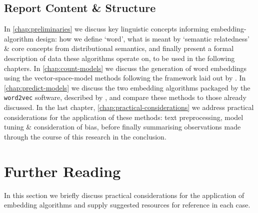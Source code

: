 \documentclass{ucetd}
\begin{document}
\section{Report Content \& Structure}
In \autoref{chap:preliminaries} we discuss key linguistic concepts informing embedding-algorithm design: how we define `word', what is meant by `semantic relatedness' \& core concepts from distributional semantics, and finally present a formal description of data these algorithms operate on, to be used in the following chapters. In \autoref{chap:count-models} we discuss the generation of word embeddings using the vector-space-model methods following the framework laid out by \textcite{turney10-from-frequen-to-meanin}. In \autoref{chap:predict-models} we discuss the two embedding algorithms packaged by the \texttt{word2vec} software, described by \textcite{mikolov13-distr-repres-words-phras-their-compos}, and compare these methods to those already discussed. In the last chapter, \autoref{chap:practical-considerations} we address practical considerations for the application of these methods: text preprocessing, model tuning \& consideration of bias, before finally summarising observations made through the course of this research in the conclusion.



\chapter{Further Reading}\label{chap:further-reading}
In this section we briefly discuss practical considerations for the application of embedding algorithms and supply suggested resources for reference in each case.
\end{document}
